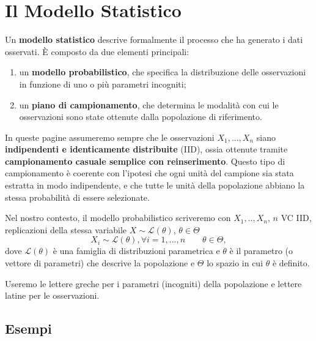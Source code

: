 \documentclass[
  11pt,
]{book}
\providecommand{\tightlist}{%
  \setlength{\itemsep}{0pt}\setlength{\parskip}{0pt}}
\theoremstyle{mytheoremstyle}
\theoremstyle{mydefstyle}
\begin{document}
\section{Il Modello Statistico}\label{il-modello-statistico}

Un \textbf{modello statistico} descrive formalmente il processo che ha generato i dati osservati. È composto da due elementi principali:

\begin{enumerate}
\def\labelenumi{\arabic{enumi}.}
\tightlist
\item
  un \textbf{modello probabilistico}, che specifica la distribuzione delle osservazioni in funzione di uno o più parametri incogniti;
\item
  un \textbf{piano di campionamento}, che determina le modalità con cui le osservazioni sono state ottenute dalla popolazione di riferimento.
\end{enumerate}

In queste pagine assumeremo sempre che le osservazioni \(X_1, ..., X_n\) siano \textbf{indipendenti e identicamente distribuite} (IID), ossia ottenute tramite \textbf{campionamento casuale semplice con reinserimento}. Questo tipo di campionamento è coerente con l'ipotesi che ogni unità del campione sia stata estratta in modo indipendente, e che tutte le unità della popolazione abbiano la stessa probabilità di essere selezionate.

Nel nostro contesto, il modello probabilistico scriveremo con \(X_1,..,X_n\), \(n\) VC IID, replicazioni della stessa variabile \(X\sim\mathscr{L}(\theta)\), \(\theta\in\Theta\)
\[
X_i \sim \mathscr{L}(\theta),\forall i=1,...,n \qquad \theta \in \Theta,
\]
dove \(\mathscr{L}(\theta)\) è una famiglia di distribuzioni parametrica e \(\theta\) è il parametro (o vettore di parametri) che descrive la popolazione e \(\Theta\) lo spazio in cui \(\theta\) è definito.

Useremo le lettere greche per i parametri (incogniti) della popolazione e lettere latine per le osservazioni.

\subsection{Esempi}\label{esempi-1}
\end{document}

